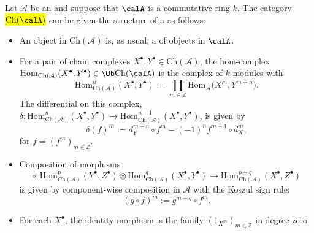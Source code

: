 \begin{definition} \label{definition:category_of_chain_complexes_of_objects_in_an_additive_category_as_a_dg_category}
Let $\mathcal{A}$ be an  and suppose that $\calA$ is  a commutative ring $k$. The category \hl{$\mathrm{Ch}(\calA)$} can be given the structure of a  as follows:
\begin{itemize}
    \item An object in $\mathrm{Ch}(\mathcal{A})$ is, as usual, a  of objects in $\calA$.    

    \item For a pair of chain complexes $X^\bullet, Y^\bullet \in \mathrm{Ch}(\mathcal{A})$, the hom-complex $\mathrm{Hom}_{\mathrm{Ch}(\mathcal{A})}(X^\bullet, Y^\bullet) \in \Ob \mathrm{Ch}(\calA)$ is the complex of $k$-modules with
    \[
    \mathrm{Hom}^n_{\mathrm{Ch}(\mathcal{A})}(X^\bullet, Y^\bullet) := \prod_{m \in \mathbb{Z}} \mathrm{Hom}_\mathcal{A}\bigl(X^m, Y^{m+n}\bigr).
    \]
    The differential on this complex, $\delta: \mathrm{Hom}^n_{\mathrm{Ch}(\mathcal{A})}(X^\bullet, Y^\bullet) \to \mathrm{Hom}^{n+1}_{\mathrm{Ch}(\mathcal{A})}(X^\bullet, Y^\bullet)$, is given by
    \[
    \delta(f)^m := d_Y^{m+n} \circ f^m - (-1)^n f^{m+1} \circ d_X^m,
    \]
    for $f = (f^m)_{m \in \mathbb{Z}}$.
    
    \item Composition of morphisms
    \[
    \circ : \mathrm{Hom}^p_{\mathrm{Ch}(\mathcal{A})}(Y^\bullet, Z^\bullet) \otimes \mathrm{Hom}^q_{\mathrm{Ch}(\mathcal{A})}(X^\bullet, Y^\bullet) \to \mathrm{Hom}^{p+q}_{\mathrm{Ch}(\mathcal{A})}(X^\bullet, Z^\bullet)
    \]
    is given by component-wise composition in $\mathcal{A}$ with the Koszul sign rule:
    \[
    (g \circ f)^m := g^{m+q} \circ f^m.
    \]
    
    \item For each $X^\bullet$, the identity morphism is the family $(1_{X^m})_{m \in \mathbb{Z}}$ in degree zero.
\end{itemize}
\end{definition}
